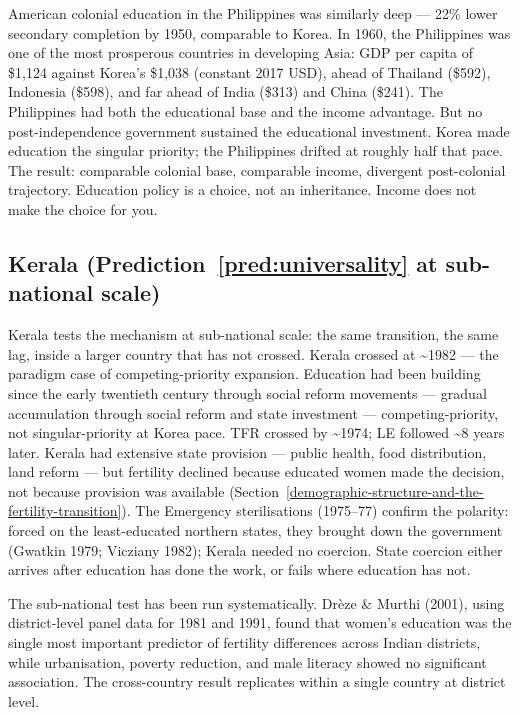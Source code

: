 \documentclass[12pt,letterpaper]{article}
\begin{document}
American colonial education in the
Philippines was similarly deep --- 22\% lower secondary completion by
1950, comparable to Korea. In 1960, the Philippines was one of the
most prosperous countries in developing Asia: GDP per capita of \$1,124
against Korea's \$1,038 (constant 2017 USD), ahead of Thailand (\$592),
Indonesia (\$598), and far ahead of India (\$313) and China (\$241). The
Philippines had both the educational base and the income advantage. But
no post-independence government sustained the educational investment.
Korea made education the singular priority;
the Philippines drifted at roughly half that pace. The result: comparable colonial base, comparable income, divergent
post-colonial trajectory. Education policy is a choice, not an inheritance. Income does not make the choice for you.

\subsection{Kerala (Prediction~\ref{pred:universality} at sub-national scale)}\label{kerala}

Kerala tests the mechanism at sub-national scale: the same transition,
the same lag, inside a larger country that has not crossed. Kerala
crossed at \textasciitilde1982 --- the paradigm case of
competing-priority expansion. Education had been building since the
early twentieth century through social reform movements --- gradual
accumulation through social reform and state investment ---
competing-priority, not singular-priority at Korea pace. TFR
crossed by \textasciitilde1974; LE followed \textasciitilde8 years
later. Kerala had extensive state provision --- public health, food
distribution, land reform --- but fertility declined because educated
women made the decision, not because provision was available
(Section~\ref{demographic-structure-and-the-fertility-transition}). The
Emergency sterilisations (1975--77) confirm the polarity: forced on
the least-educated northern states, they brought down the government
(Gwatkin 1979; Vicziany 1982); Kerala needed no coercion. State
coercion either arrives after education has done the work, or fails
where education has not.

The sub-national test has been run systematically. Drèze \& Murthi
(2001), using district-level panel data for 1981 and 1991, found that
women's education was the single most important predictor of fertility
differences across Indian districts, while urbanisation, poverty
reduction, and male literacy showed no significant association. The
cross-country result replicates within a single country at district
level.
\end{document}
